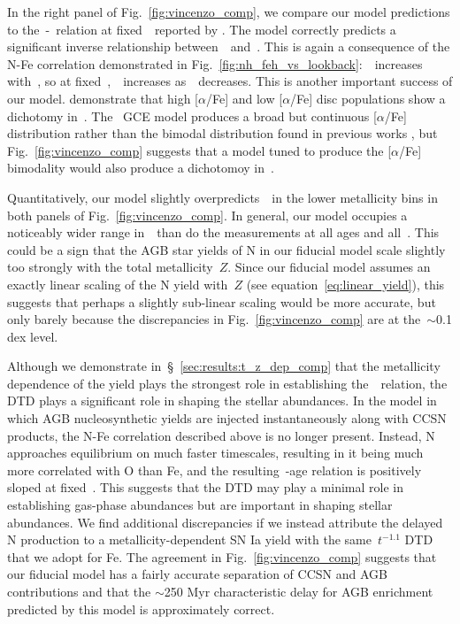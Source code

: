 \documentclass[ms.tex]{subfiles}
\begin{document}
\par
In the right panel of Fig.~\ref{fig:vincenzo_comp}, we compare our model
predictions to the~\no-\ofe~relation at fixed~\oh~reported by
\citet{Vincenzo2021}.
The model correctly predicts a significant inverse relationship
between~\no~and~\ofe.
This is again a consequence of the N-Fe correlation demonstrated in
Fig.~\ref{fig:nh_feh_vs_lookback}:~\nh~increases with~\feh, so at
fixed~\oh,~\no~increases as~\ofe~decreases.
This is another important success of our model.
\citet{Vincenzo2021} demonstrate that high [$\alpha$/Fe] and low [$\alpha$/Fe]
disc populations show a dichotomy in~\no.
The~\citet{Johnson2021} GCE model produces a broad but continuous [$\alpha$/Fe]
distribution rather than the bimodal distribution found in previous works
\citep[e.g.][]{Hayden2015}, but Fig.~\ref{fig:vincenzo_comp} suggests that a
model tuned to produce the [$\alpha$/Fe] bimodality would also produce a
dichotomoy in~\no.
\par
Quantitatively, our model slightly overpredicts~\no~in the lower metallicity
bins in both panels of Fig.~\ref{fig:vincenzo_comp}.
In general, our model occupies a noticeably wider range in~\no~than do the
\citet{Vincenzo2021} measurements at all ages and all~\ofe.
This could be a sign that the AGB star yields of N in our fiducial model scale
slightly too strongly with the total metallicity~$Z$.
Since our fiducial model assumes an exactly linear scaling of the N yield
with~$Z$ (see equation~\ref{eq:linear_yield}), this suggests that perhaps a
slightly sub-linear scaling would be more accurate, but only barely because
the discrepancies in Fig.~\ref{fig:vincenzo_comp} are at the~$\sim$0.1 dex
level.
\par
Although we demonstrate in~\S~\ref{sec:results:t_z_dep_comp} that the
metallicity dependence of the yield plays the strongest role in establishing
the~\ohno~relation, the DTD plays a significant role in shaping the stellar
abundances.
In the model in which AGB nucleosynthetic yields are injected instantaneously
along with CCSN products, the N-Fe correlation described above is no longer
present.
Instead, N approaches equilibrium on much faster timescales, resulting in it
being much more correlated with O than Fe, and the resulting~\no-age relation
is positively sloped at fixed~\feh.
This suggests that the DTD may play a minimal role in establishing gas-phase
abundances but are important in shaping stellar abundances.
We find additional discrepancies if we instead attribute the delayed N
production to a metallicity-dependent SN Ia yield with the same~$t^{-1.1}$ DTD
that we adopt for Fe.
The agreement in Fig.~\ref{fig:vincenzo_comp} suggests that our fiducial model
has a fairly accurate separation of CCSN and AGB contributions and that the
$\sim$250 Myr characteristic delay for AGB enrichment predicted by this model
is approximately correct.
\end{document}

